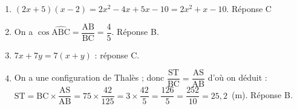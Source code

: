 
\medskip

%
%
%
%
\begin{enumerate}
\item $(2x + 5)(x - 2) = 2x^2 - 4x + 5x - 10 = 2x^2 + x - 10$. Réponse C
\item On a $\cos \widehat{\text{ABC}} = \dfrac{\text{AB}}{\text{BC}} = \dfrac{4}{5}$. Réponse B.
\item $7x + 7y = 7(x + y)$ : réponse C.
\item On a une configuration de Thalès ; donc $\dfrac{\text{ST}}{\text{BC}} = \dfrac{\text{AS}}{\text{AB}}$ d'où on déduit : $\text{ST} = \text{BC} \times \dfrac{\text{AS}}{\text{AB}} = 75 \times \dfrac{42}{125} = 3 \times \dfrac{42}{5} = \dfrac{126}{5} = \dfrac{252}{10} = 25,2$~(m). Réponse B.
\end{enumerate}

\vspace{0,5cm}

